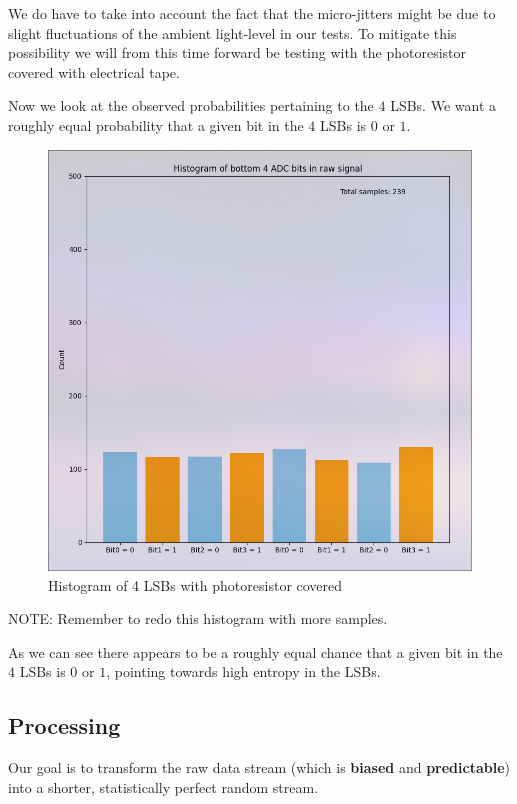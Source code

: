 We do have to take into account the fact that the micro-jitters 
might be due to slight fluctuations of the ambient light-level in 
our tests. To mitigate this possibility we will from this time 
forward be testing with the photoresistor covered with electrical 
tape. 

\newpage
Now we look at the observed probabilities pertaining to 
the \(4\) LSBs. We want a roughly equal probability that a given 
bit in the \(4\) LSBs is \(0\) or \(1\).

\begin{figure}[h]
    \centering
    \includegraphics[width=0.6\linewidth]{./images/LSB_HISTOGRAM_COVERED_239.png} 
    \caption{Histogram of 4 LSBs with photoresistor covered}
    \label{fig:histogram_LSB_covered}
\end{figure}

NOTE: Remember to redo this histogram with more samples.

As we can see there appears to be a roughly equal chance that a 
given bit in the \(4\) LSBs is \(0\) or \(1\), pointing towards 
high entropy in the LSBs.
 

\subsection{Processing}
Our goal is to transform the raw data stream 
(which is \textbf{biased} and \textbf{predictable}) into a shorter, 
statistically perfect random stream.

